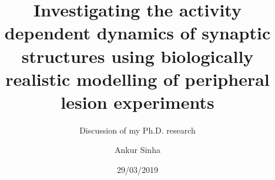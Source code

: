 
\usepackage{color}
\usepackage{tipa}
\usepackage[scale=2]{ccicons}
\usepackage{amssymb}
\usepackage{tikz}
\usetikzlibrary{arrows.meta, arrows}
\usepackage{jneurosci}
\usepackage{subfig}
\usepackage[T1]{fontenc}
\usepackage[utf8]{inputenc}
\usepackage[style=nature,backend=biber,autocite=footnote]{biblatex}

\usepackage[default,osfigures,scale=0.95]{opensans}
\usepackage[normalem]{ulem}
\usepackage{hyperref}
\hypersetup{colorlinks,linkcolor=Green,urlcolor=links}
\usepackage{graphicx}
\usepackage{algorithmic}
\usepackage{textcomp}
\usepackage{wrapfig}
\usepackage{textgreek}
\usepackage{euler}



\title{Investigating the activity dependent dynamics of synaptic structures using biologically realistic modelling of peripheral lesion experiments}
\subtitle{Discussion of my Ph.D. research}
\author[Ankur Sinha]{Ankur Sinha}
\date{29/03/2019}



\begin{frame}
  \titlepage{}
\end{frame}

